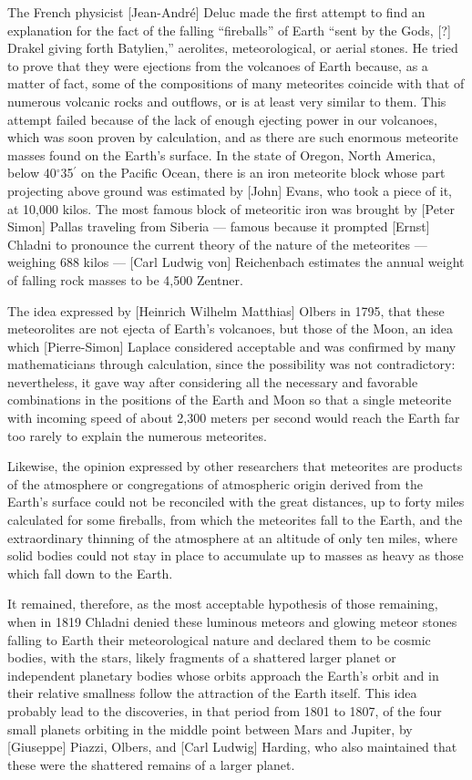 \documentclass[a4paper, 12pt, oneside]{article}
\begin{document}
The French physicist [Jean-André] Deluc made the first attempt to find an explanation for the fact of the falling ``fireballs'' of Earth ``sent by the Gods, [?] Drakel giving forth Batylien,'' aerolites, meteorological, or aerial stones. He tried to prove that they were ejections from the volcanoes of Earth because, as a matter of fact, some of the compositions of many meteorites coincide with that of numerous volcanic rocks and outflows, or is at least very similar to them. This attempt failed because of the lack of enough ejecting power in our volcanoes, which was soon proven by calculation, and as there are such enormous meteorite masses found on the Earth's surface. In the state of Oregon, North America, below 40$^{\circ}$35$^\prime$ on the Pacific Ocean, there is an iron meteorite block whose part projecting above ground was estimated by [John] Evans, who took a piece of it, at 10,000 kilos. The most famous block of meteoritic iron was brought by [Peter Simon] Pallas traveling from Siberia --- famous because it prompted [Ernst] Chladni to pronounce the current theory of the nature of the meteorites --- weighing 688 kilos --- [Carl Ludwig von] Reichenbach estimates the annual weight of falling rock masses to be 4,500 Zentner.

The idea expressed by [Heinrich Wilhelm Matthias] Olbers in 1795, that these meteorolites are not ejecta of Earth's volcanoes, but those of the Moon, an idea which [Pierre-Simon] Laplace considered acceptable and was confirmed by many mathematicians through calculation, since the possibility was not contradictory: nevertheless, it gave way after considering all the necessary and favorable combinations in the positions of the Earth and Moon so that a single meteorite with incoming speed of about 2,300 meters per second would reach the Earth far too rarely to explain the numerous meteorites.

Likewise, the opinion expressed by other researchers that meteorites are products of the atmosphere or congregations of atmospheric origin derived from the Earth's surface could not be reconciled with the great distances, up to forty miles calculated for some fireballs, from which the meteorites fall to the Earth, and the extraordinary thinning of the atmosphere at an altitude of only ten miles, where solid bodies could not stay in place to accumulate up to masses as heavy as those which fall down to the Earth.

It remained, therefore, as the most acceptable hypothesis of those remaining, when in 1819 Chladni denied these luminous meteors and glowing meteor stones falling to Earth their meteorological nature and declared them to be cosmic bodies, with the stars, likely fragments of a shattered larger planet or independent planetary bodies whose orbits approach the Earth's orbit and in their relative smallness follow the attraction of the Earth itself. This idea probably lead to the discoveries, in that period from 1801 to 1807, of the four small planets orbiting in the middle point between Mars and Jupiter, by [Giuseppe] Piazzi, Olbers, and [Carl Ludwig] Harding, who also maintained that these were the shattered remains of a larger planet.
\end{document}
